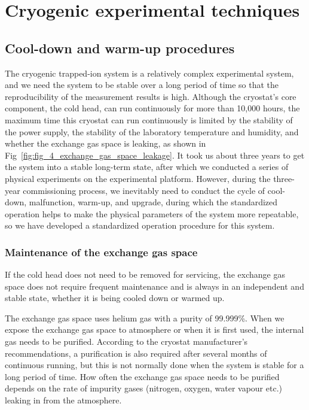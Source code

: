 
\chapter{Cryogenic experimental techniques}
\label{chap:cryogenic_experimental_techniques}

\section{Cool-down and warm-up procedures}

The cryogenic trapped-ion system is a relatively complex experimental system, and we need the system to be stable over a long period of time so that the reproducibility of the measurement results is high. Although the cryostat's core component, the cold head, can run continuously for more than 10,000 hours, the maximum time this cryostat can run continuously is limited by the stability of the power supply, the stability of the laboratory temperature and humidity, and whether the exchange gas space is leaking, as shown in Fig~\ref{fig:fig_4_exchange_gas_space_leakage}. It took us about three years to get the system into a stable long-term state, after which we conducted a series of physical experiments on the experimental platform. However, during the three-year commissioning process, we inevitably need to conduct the cycle of cool-down, malfunction, warm-up, and upgrade, during which the standardized operation helps to make the physical parameters of the system more repeatable, so we have developed a standardized operation procedure for this system.

\subsection{Maintenance of the exchange gas space}
If the cold head does not need to be removed for servicing, the exchange gas space does not require frequent maintenance and is always in an independent and stable state, whether it is being cooled down or warmed up.

The exchange gas space uses helium gas with a purity of 99.999\%. When we expose the exchange gas space to atmosphere or when it is first used, the internal gas needs to be purified. According to the cryostat manufacturer's recommendations, a purification is also required after several months of continuous running, but this is not normally done when the system is stable for a long period of time. How often the exchange gas space needs to be purified depends on the rate of impurity gases (nitrogen, oxygen, water vapour etc.) leaking in from the atmosphere.

